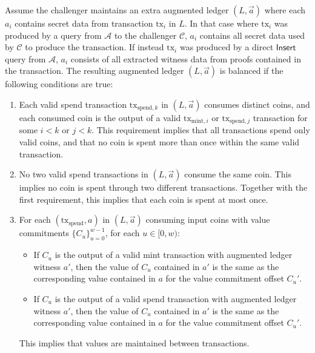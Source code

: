 \documentclass{llncs}
\newcommand{\func}[1]{\mathsf{#1}}
\begin{document}
Assume the challenger maintains an extra augmented ledger $(L, \vec{a})$ where each $a_i$ contains secret data from transaction $\text{tx}_i$ in $L$.
In that case where $\text{tx}_i$ was produced by a query from $\mathcal{A}$ to the challenger $\mathcal{C}$, $a_i$ contains all secret data used by $\mathcal{C}$ to produce the transaction.
If instead $\text{tx}_i$ was produced by a direct $\func{Insert}$ query from $\mathcal{A}$, $a_i$ consists of all extracted witness data from proofs contained in the transaction.
The resulting augmented ledger $(L, \vec{a})$ is balanced if the following conditions are true:
\begin{enumerate}
    \item\label{cond:distinct} Each valid spend transaction $\text{tx}_{\text{spend},k}$ in $(L, \vec{a})$ consumes distinct coins, and each consumed coin is the output of a valid $\text{tx}_{\text{mint},i}$ or $\text{tx}_{\text{spend},j}$ transaction for some $i < k$ or $j < k$.
    This requirement implies that all transactions spend only valid coins, and that no coin is spent more than once within the same valid transaction.
    
    \item\label{cond:multiple} No two valid spend transactions in $(L, \vec{a})$ consume the same coin.
    This implies no coin is spent through two different transactions.
    Together with the first requirement, this implies that each coin is spent at most once.
    
    \item\label{cond:value} For each $(\text{tx}_{\text{spend}}, a)$ in $(L, \vec{a})$ consuming input coins with value commitments $\{C_u\}_{u=0}^{w-1}$, for each $u \in [0,w)$:
    \begin{itemize}
        \item If $C_u$ is the output of a valid mint transaction with augmented ledger witness $a'$, then the value of $C_u$ contained in $a'$ is the same as the corresponding value contained in $a$ for the value commitment offset $C_u'$.
        \item If $C_u$ is the output of a valid spend transaction with augmented ledger witness $a'$, then the value of $C_u$ contained in $a'$ is the same as the corresponding value contained in $a$ for the value commitment offset $C_u'$.
    \end{itemize}
    This implies that values are maintained between transactions.
    

\end{enumerate}
\end{document}
